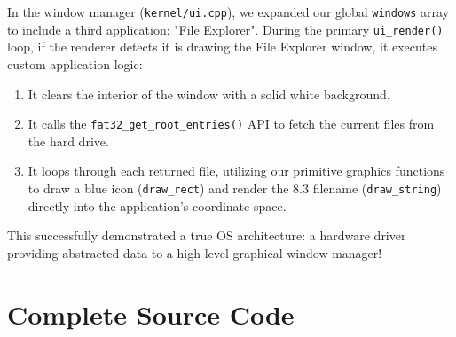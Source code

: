 \documentclass[12pt,a4paper]{report}
\begin{document}
In the window manager (\texttt{kernel/ui.cpp}), we expanded our global \texttt{windows} array to include a third application: "File Explorer". During the primary \texttt{ui\_render()} loop, if the renderer detects it is drawing the File Explorer window, it executes custom application logic:
\begin{enumerate}
    \item It clears the interior of the window with a solid white background.
    \item It calls the \texttt{fat32\_get\_root\_entries()} API to fetch the current files from the hard drive.
    \item It loops through each returned file, utilizing our primitive graphics functions to draw a blue icon (\texttt{draw\_rect}) and render the 8.3 filename (\texttt{draw\_string}) directly into the application's coordinate space.
\end{enumerate}

This successfully demonstrated a true OS architecture: a hardware driver providing abstracted data to a high-level graphical window manager!

\newpage

\chapter{Complete Source Code}
\end{document}
